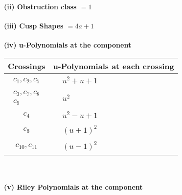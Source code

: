 \documentclass[1p]{elsarticle_modified}
\theoremstyle{definition}
\begin{document}
\flushleft \textbf{(ii) Obstruction class $= 1$}\\~\\
\flushleft \textbf{(iii) Cusp Shapes $= 4 a+1$}\\~\\
\newpage\renewcommand{\arraystretch}{1}
\flushleft \textbf{(iv) u-Polynomials at the component}\newline \\
\begin{tabular}{m{50pt}|m{274pt}}
Crossings & \hspace{64pt}u-Polynomials at each crossing \\
\hline $$\begin{aligned}c_{1},c_{2},c_{5}\end{aligned}$$&$\begin{aligned}
&u^2+u+1
\end{aligned}$\\
\hline $$\begin{aligned}c_{3},c_{7},c_{8}\\c_{9}\end{aligned}$$&$\begin{aligned}
&u^2
\end{aligned}$\\
\hline $$\begin{aligned}c_{4}\end{aligned}$$&$\begin{aligned}
&u^2- u+1
\end{aligned}$\\
\hline $$\begin{aligned}c_{6}\end{aligned}$$&$\begin{aligned}
&(u+1)^2
\end{aligned}$\\
\hline $$\begin{aligned}c_{10},c_{11}\end{aligned}$$&$\begin{aligned}
&(u-1)^2
\end{aligned}$\\
\hline
\end{tabular}\\~\\
\newpage\renewcommand{\arraystretch}{1}
\flushleft \textbf{(v) Riley Polynomials at the component}\newline \\
\end{document}
